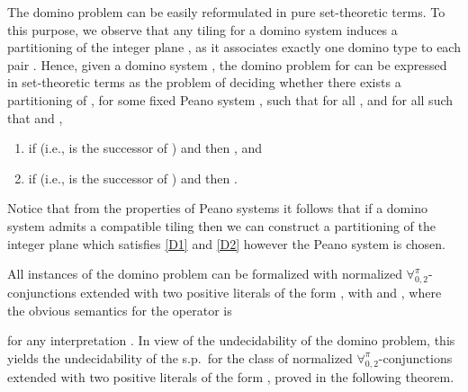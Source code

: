 \documentclass[submission,copyright,creativecommons]{eptcs}
\newcommand{\Lang}{\ensuremath{\mathbf{\forall}^{\pi}_{0,2}}\xspace}
\begin{document}
The domino problem can be easily reformulated in pure set-theoretic
terms.  To this purpose, we observe that any tiling  for a domino
system induces a partitioning of the integer plane ,
as it associates exactly one domino type to each pair .  Hence, given a domino system
, the domino problem for
 can be expressed in set-theoretic terms as the problem of
deciding whether there exists a partitioning  of , for some fixed
Peano system , such that for
all , and for all  such
that  and ,
\begin{enumerate}[label=\textbf{(D\arabic*)}]
\item\label{D1} if  (i.e.,  is the successor
of ) and  then , and

\item\label{D2} if  (i.e.,  is the successor
of ) and  then .
\end{enumerate}

Notice that from the properties of Peano systems it follows that if a
domino system  admits a compatible tiling  then we can
construct a partitioning of the integer plane which satisfies \ref{D1}
and \ref{D2} however the Peano system is chosen.



All instances of the domino problem can be formalized with normalized
\Lang-conjunctions extended with two positive literals of the form , with  and ,
where the obvious semantics for the operator  is 

for any interpretation .  In view of the undecidability of the
domino problem, this yields the undecidability of the s.p.\ for the
class  of normalized \Lang-conjunctions extended with two
positive literals of the form , proved in the
following theorem.
\end{document}
